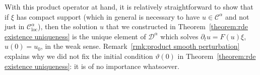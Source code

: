 \documentclass[a4paper,11pt]{article}
\newcommand{\tmop}[1]{\ensuremath{\operatorname{#1}}}
\theoremstyle{remark}
\newcommand{\CC}{\ensuremath{\mathscr{C}}}
\newcommand{\CD}{\ensuremath{\mathscr{D}}}
\newcommand{\lpara}{\,\mathord{\prec}\,}
\newcommand{\reso}{\,\mathord{\circ}\,}
\begin{document}
  With this product operator at hand, it is relatively straightforward to show that if $\xi$ has compact support (which in general is necessary to have $u \in \CC^\alpha$ and not just in $\CC^\alpha_{\mathrm{loc}}$), then the solution $u$ that we constructed in Theorem~\ref{theorem:rde existence uniqueness} is the unique element of $\CD^\alpha$ which solves $\partial_t u = F(u) \xi$, $u(0) = u_0$, in the weak sense. Remark~\ref{rmk:product smooth perturbation} explains why we did not fix the initial condition $\vartheta(0)$ in Theorem~\ref{theorem:rde existence uniqueness}: it is of no importance whatsoever.
  
\end{document}
